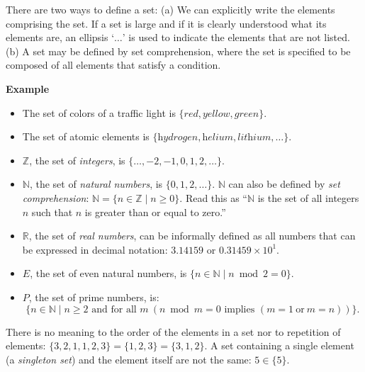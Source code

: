\documentclass[12pt,a4paper]{article}
\newenvironment{example}{\textbf{Example}}{}
\begin{document}
There are two ways to define a set: (a) We can explicitly write the
elements comprising the set. If a set is large and if it is clearly
understood what its elements are, an ellipsis `$\ldots$' is used to
indicate the elements that are not listed. (b) A set may be defined by
set comprehension, where the set is specified to be composed of
all elements that satisfy a condition. 


\begin{example}\mbox{}
\begin{itemize}
\item The set of colors of a traffic light is $\{\textit{red}, \textit{yellow}, \textit{green}\}$.

\item The set of atomic elements is $\{\textit{hydrogen}, \textit{helium}, \textit{lithium}, \ldots\}$.

\item $\mathbb{Z}$, the set of
\emph{integers}, is $\{\ldots,-2,-1,0,1,2,\ldots\}$.

\item $\mathbb{N}$, the set of \emph{natural numbers}, is $\{0,1,2,\ldots\}$. $\mathbb{N}$ can also be defined by \emph{set comprehension}: $\mathbb{N}=\{n\in \mathbb{Z} \mid n\geq 0\}$. Read this as ``$\mathbb{N}$ is the set of all integers $n$ such that $n$ is greater than or equal to zero.''

\item $\mathbb{R}$, the set of \emph{real numbers}, can be informally defined as all numbers that can be expressed in decimal notation: $3.14159$ or $0.31459\times 10^1$.

\item $E$, the set of even natural numbers, is $\{n\in \mathbb{N} \mid n \bmod 2 = 0\}$.

\item $P$, the set of prime numbers, is:
\[
\{n\in \mathbb{N} \mid n\geq 2 \textrm{\ and for all\ } m \:(n \bmod m = 0 \textrm{\ implies\ } (m=1 \mathrm{\ or\ } m=n))\}.
\]
\end{itemize}
\end{example}

There is no meaning to the order of the elements in a set nor to
repetition of elements: $\{3,2,1,1,2,3\}=\{1,2,3\}=\{3,1,2\}$.
A set containing a single element (a \emph{singleton set})
and the element itself are not the same: $5\in \{5\}$.
\end{document}
